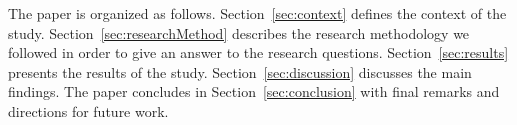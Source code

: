 %



The paper is organized as follows. Section~\ref{sec:context} defines the context of the study. 
Section~\ref{sec:researchMethod} describes the research methodology we followed in order to give an answer to the research questions.
Section~\ref{sec:results} presents the results of the study. Section~\ref{sec:discussion} discusses the main findings.  
The paper concludes in Section~\ref{sec:conclusion} with final remarks and directions for future work.

